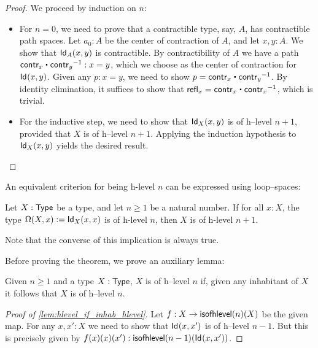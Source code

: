 \begin{proof}
 We proceed by induction on $n$:
\begin{itemize}
 \item For $n = 0$, we need to prove that a contractible type, say, $A$, has contractible path spaces.
       Let $a_0: A$ be the center of contraction of $A$, and let $x, y : A$. We show that $\idtype[A]{x}{y}$
       is contractible.
       By contractibility of $A$ we have a path $\contr_x \ct \opp{\contr_y} : x = y$, which we choose as
       the center of contraction for $\idtype{x}{y}$.
       Given any $p : x = y$, we need to show $p = \contr_x \ct \opp{\contr_y}$. 
           By identity elimination, it suffices to show that
        $\refl{x} = \contr_x \ct \opp{\contr_x}$, which is trivial.

 \item For the inductive step, we need to show that $\idtype[X]{x}{y}$ is of h--level $n+1$, provided
          that $X$ is of h--level $n+1$. Applying the induction hypothesis to $\idtype[X]{x}{y}$
         yields the desired result.
\end{itemize}

\end{proof}


An equivalent criterion for being h-level $n$ can be expressed using loop--spaces:

\begin{thm}\label{thm:hlevel_loops}
 Let $X : \Type$ be a type, and let $n\geq 1$ be a natural number. 
  If for all $x : X$, the type $\Omega(X, x) := \idtype[X]{x}{x}$ is of h-level $n$, 
       then $X$ is of h-level $n+1$.
\end{thm}

Note that the converse of this implication is always true.

Before proving the theorem, we prove an auxiliary lemma:

\begin{lem}\label{lem:hlevel_if_inhab_hlevel}
 Given $n \geq 1$ and a type $X : \Type$, $X$ is of h--level $n$ if, given any inhabitant of $X$ it follows that $X$ is 
   of h--level $n$.
\end{lem}

\begin{proof}[Proof of \autoref{lem:hlevel_if_inhab_hlevel}]
  Let $f : X \to \isofhlevel(n)(X)$ be the given map. For any $x, x' : X$ we need to show that
     $\idtype{x}{x'}$ is of h--level $n - 1$. But this is precisely given by 
    $f(x)(x)(x') : \isofhlevel(n-1)(\idtype{x}{x'}) $.
\end{proof}


